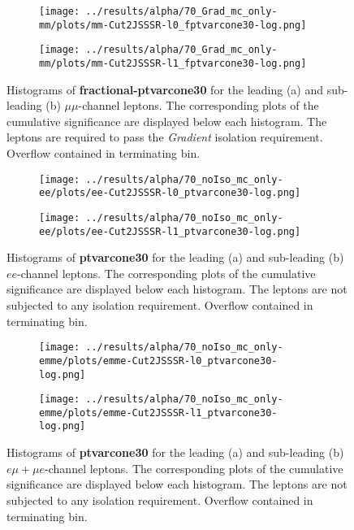 \begin{figure}
\centering
\begin{subfigure}{.65\textwidth}
  \centering
 \texttt{[image: ../results/alpha/70\_Grad\_mc\_only-mm/plots/mm-Cut2JSSSR-l0\_fptvarcone30-log.png]}
 \caption{}
  \label{mm_leading_topoetcone}
\end{subfigure}
\begin{subfigure}{.65\textwidth}
 \centering
  \texttt{[image: ../results/alpha/70\_Grad\_mc\_only-mm/plots/mm-Cut2JSSSR-l1\_fptvarcone30-log.png]}
  \label{mm_subleading_topoetcone}
\end{subfigure}
\caption{Histograms of \textbf{fractional-ptvarcone30} for the leading (a) and sub-leading (b) $\mu\mu$-channel leptons. The corresponding plots of the cumulative significance are displayed below each histogram. The leptons are required to pass the \textit{Gradient} isolation requirement. Overflow contained in terminating bin.}
\label{fptvarcone30_isoplots_wGrad_mm}
\end{figure}
\begin{figure}
\centering
\begin{subfigure}{.65\textwidth}
  \centering
  \texttt{[image: ../results/alpha/70\_noIso\_mc\_only-ee/plots/ee-Cut2JSSSR-l0\_ptvarcone30-log.png]}
  \caption{}
  \label{ee_leading_topoetcone}
\end{subfigure}
\begin{subfigure}{.65\textwidth}
 \centering
  \texttt{[image: ../results/alpha/70\_noIso\_mc\_only-ee/plots/ee-Cut2JSSSR-l1\_ptvarcone30-log.png]}
  \caption{}
  \label{ee_subleading_topoetcone}
\end{subfigure}
\caption{Histograms of \textbf{ptvarcone30} for the leading (a) and sub-leading (b) $ee$-channel leptons. The corresponding plots of the cumulative significance are displayed below each histogram. The leptons are not subjected to any isolation requirement. Overflow contained in terminating bin.}
\label{ptvarcone30_isoplots_noIso_ee}
\end{figure}
\begin{figure}
\centering
\begin{subfigure}{.65\textwidth}
  \centering
  \texttt{[image: ../results/alpha/70\_noIso\_mc\_only-emme/plots/emme-Cut2JSSSR-l0\_ptvarcone30-log.png]}
  \caption{}
  \label{emme_leading_topoetcone}
\end{subfigure}
\begin{subfigure}{.65\textwidth}
 \centering
  \texttt{[image: ../results/alpha/70\_noIso\_mc\_only-emme/plots/emme-Cut2JSSSR-l1\_ptvarcone30-log.png]}
  \caption{}
  \label{emme_subleading_topoetcone}
\end{subfigure}
\caption{Histograms of \textbf{ptvarcone30} for the leading (a) and sub-leading (b) $e\mu+\mu e$-channel leptons. The corresponding plots of the cumulative significance are displayed below each histogram. The leptons are not subjected to any isolation requirement. Overflow contained in terminating bin.}
\label{ptvarcone30_isoplots_noIso_emme}
\end{figure}
